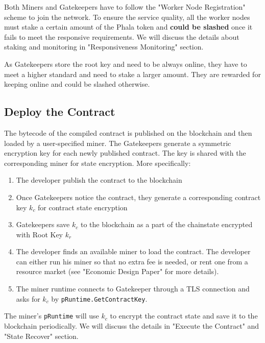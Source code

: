Both Miners and Gatekeepers have to follow the "Worker Node Registration" scheme to join the network. To ensure the service quality, all the worker nodes must stake a certain amount of the Phala token and \textbf{could be slashed} once it fails to meet the responsive requirements. We will discuss the details about staking and monitoring in "Responsiveness Monitoring" section.

As Gatekeepers store the root key and need to be always online, they have to meet a higher standard and need to stake a larger amount. They are rewarded for keeping online and could be slashed otherwise.


\subsection{Deploy the Contract}

The bytecode of the compiled contract is published on the blockchain and then loaded by a user-specified miner. The Gatekeepers generate a symmetric encryption key for each newly published contract. The key is shared with the corresponding miner for state encryption. More specifically:

\begin{enumerate}
    \item The developer publish the contract to the blockchain
    \item Once Gatekeepers notice the contract, they generate a corresponding contract key $k_c$ for contract state encryption
    \item Gatekeepers save $k_c$ to the blockchain as a part of the chainstate encrypted with Root Key $k_r$
    \item The developer finds an available miner to load the contract. The developer can either run his miner so that no extra fee is needed, or rent one from a resource market (see "Economic Design Paper" for more details).
    \item The miner runtime connects to Gatekeeper through a TLS connection and asks for $k_c$ by \texttt{pRuntime.GetContractKey}.
\end{enumerate}

The miner's \texttt{pRuntime} will use $k_c$ to encrypt the contract state and save it to the blockchain periodically. We will discuss the details in "Execute the Contract" and "State Recover" section.

